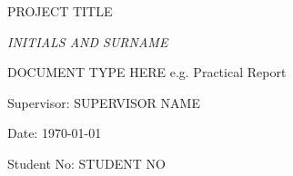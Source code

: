 \documentclass[a4paper, 11pt]{article} %
\begin{document}
\begin{titlepage}



\center
\vspace{4cm}

{\Huge PROJECT TITLE\par}

\vspace{2cm}
	
{\Large\itshape INITIALS AND SURNAME\par}
	
\vspace{2cm}
	
{\LARGE DOCUMENT TYPE HERE  e.g. Practical Report\par}
		
\vspace{5cm}
	
\begin{flushleft}

\large	Supervisor: SUPERVISOR NAME\par
\large	Date: \today  \par %
\large	Student No: STUDENT NO\par
\end{flushleft}

\end{titlepage}
\end{document}
